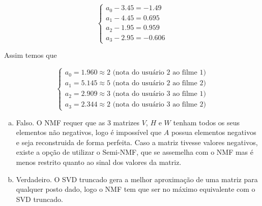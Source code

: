 \documentclass[11pt]{article}
\begin{document}
\begin{exerc}
\begin{enumerate}[a.]
$$\begin{cases}
a_0 - 3.45 = -1.49\\
a_1 - 4.45 = 0.695\\
a_2 - 1.95 = 0.959\\
a_3 - 2.95 = -0.606
\end{cases}$$

Assim temos que

$$\begin{cases}
a_0 = 1.960 \approx 2 \text{ (nota do usuário 2 ao filme 1)}\\
a_1 = 5.145 \approx 5 \text{ (nota do usuário 2 ao filme 2)}\\
a_2 = 2.909 \approx 3 \text{ (nota do usuário 3 ao filme 1)}\\
a_3 = 2.344 \approx 2 \text{ (nota do usuário 3 ao filme 2)}
\end{cases}$$

\end{enumerate}
\end{exerc}

\begin{exerc}
\begin{enumerate}[a.]
.
\item
Falso. O NMF requer que as 3 matrizes $V$, $H$ e $W$ tenham todos os seus elementos não negativos, logo é impossível que $A$ possua elementos negativos e seja reconstruida de forma perfeita. Caso a matriz tivesse valores negativos, existe a opção de utilizar o Semi-NMF, que se assemelha com o NMF mas é menos restrito quanto ao sinal dos valores da matriz.

\item
Verdadeiro. O SVD truncado gera a melhor aproximação de uma matriz para qualquer posto dado, logo o NMF tem que ser no máximo equivalente com o SVD truncado.

\end{enumerate}
\end{exerc}
\end{document}
